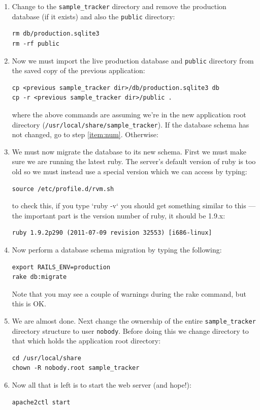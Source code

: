 \documentclass[12pt,twoside]{article}
\begin{document}
\begin{enumerate}
\item
Change to the \verb=sample_tracker= directory and remove the production 
database (if it exists) and also the \verb=public= directory:
\begin{verbatim}
rm db/production.sqlite3
rm -rf public
\end{verbatim}
\item
Now we must import the live production database and \verb=public=
directory from the saved copy of the previous application:
\begin{verbatim}
cp <previous sample_tracker dir>/db/production.sqlite3 db
cp -r <previous sample_tracker dir>/public .
\end{verbatim}
where the above commands are assuming we're in the new application root
directory (\verb=/usr/local/share/sample_tracker=).
If the database schema has not changed, go to step 
\ref{item:num}. Otherwise:
\item
We must now migrate the database to its new schema. First we must make
sure we are running the latest ruby. The server's default version of ruby is
too old so we must instead use a special version which we can access by
typing:
\begin{verbatim}
source /etc/profile.d/rvm.sh
\end{verbatim}
to check this, if you type `ruby -v` you should get something
similar to this --- the important part is the version number of ruby,
it should be 1.9.x:
\begin{verbatim}
ruby 1.9.2p290 (2011-07-09 revision 32553) [i686-linux]
\end{verbatim}
\item
Now perform a database schema migration by typing the following:
\begin{verbatim}
export RAILS_ENV=production
rake db:migrate
\end{verbatim}
Note that you may see a couple of warnings during the rake command, but
this is OK.
\item\label{item:num}
We are almost done. Next change the ownership of the entire 
\verb=sample_tracker=
directory structure to user \verb=nobody=. Before doing this we change
directory to that which holds the application root directory:
\begin{verbatim}
cd /usr/local/share
chown -R nobody.root sample_tracker
\end{verbatim}
\item
Now all that is left is to start the web server (and hope!):
\begin{verbatim}
apache2ctl start
\end{verbatim}

\end{enumerate}
\end{document}
